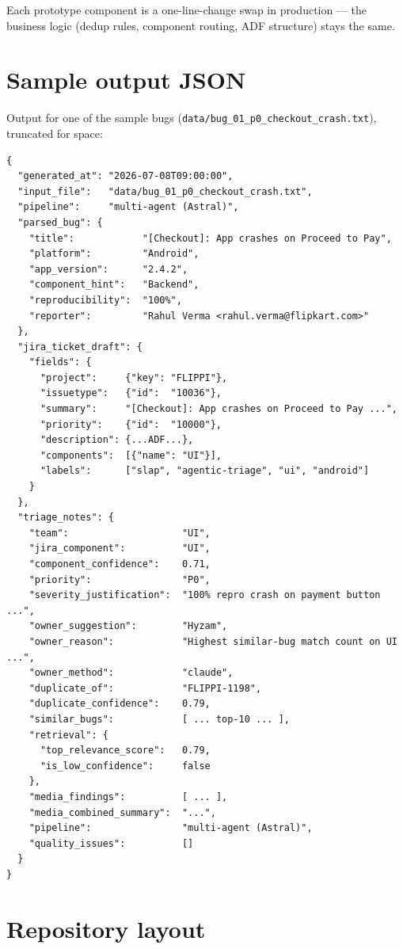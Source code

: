 \documentclass[11pt,a4paper]{article}
\begin{document}
Each prototype component is a one-line-change swap in production ---
the business logic (dedup rules, component routing, ADF structure) stays
the same.

\newpage

\appendix

\section{Sample output JSON}

Output for one of the sample bugs
(\texttt{data/bug\_01\_p0\_checkout\_crash.txt}), truncated for space:

\begin{lstlisting}
{
  "generated_at": "2026-07-08T09:00:00",
  "input_file":   "data/bug_01_p0_checkout_crash.txt",
  "pipeline":     "multi-agent (Astral)",
  "parsed_bug": {
    "title":            "[Checkout]: App crashes on Proceed to Pay",
    "platform":         "Android",
    "app_version":      "2.4.2",
    "component_hint":   "Backend",
    "reproducibility":  "100%",
    "reporter":         "Rahul Verma <rahul.verma@flipkart.com>"
  },
  "jira_ticket_draft": {
    "fields": {
      "project":     {"key": "FLIPPI"},
      "issuetype":   {"id":  "10036"},
      "summary":     "[Checkout]: App crashes on Proceed to Pay ...",
      "priority":    {"id":  "10000"},
      "description": {...ADF...},
      "components":  [{"name": "UI"}],
      "labels":      ["slap", "agentic-triage", "ui", "android"]
    }
  },
  "triage_notes": {
    "team":                    "UI",
    "jira_component":          "UI",
    "component_confidence":    0.71,
    "priority":                "P0",
    "severity_justification":  "100% repro crash on payment button ...",
    "owner_suggestion":        "Hyzam",
    "owner_reason":            "Highest similar-bug match count on UI ...",
    "owner_method":            "claude",
    "duplicate_of":            "FLIPPI-1198",
    "duplicate_confidence":    0.79,
    "similar_bugs":            [ ... top-10 ... ],
    "retrieval": {
      "top_relevance_score":   0.79,
      "is_low_confidence":     false
    },
    "media_findings":          [ ... ],
    "media_combined_summary":  "...",
    "pipeline":                "multi-agent (Astral)",
    "quality_issues":          []
  }
}
\end{lstlisting}

\section{Repository layout}
\end{document}
